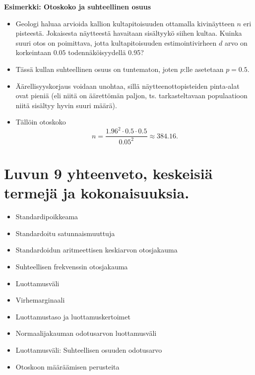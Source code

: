 \documentclass[
]{book}
\providecommand{\tightlist}{%
  \setlength{\itemsep}{0pt}\setlength{\parskip}{0pt}}
\begin{document}
\begin{eblock}{}

\textbf{Esimerkki: Otoskoko ja suhteellinen osuus}

\begin{itemize}
\item
  Geologi haluaa arvioida kallion kultapitoisuuden ottamalla kivinäytteen \(n\) eri pisteestä. Jokaisesta näytteestä havaitaan sisältyykö siihen kultaa. Kuinka suuri otos on poimittava, jotta kultapitoisuuden estimointivirheen \(d\) arvo on korkeintaan \(0.05\) todennäköisyydellä 0.95?
\item
  Tässä kullan suhteellinen osuus on tuntematon, joten \(p\):lle asetetaan \(p=0.5\).
\item
  Äärellisyyskorjaus voidaan unohtaa, sillä näytteenottopisteiden pinta-alat ovat pieniä (eli niitä on äärettömän paljon, ts. tarkasteltavaan populaatioon niitä sisältyy
  hyvin suuri määrä).
\item
  Tällöin otoskoko
  \[
  n = \frac{1.96^2 \cdot 0.5 \cdot 0.5}{0.05^2} \approx 384.16.
  \]
\end{itemize}

\end{eblock}

\hypertarget{luvun-9-yhteenveto-keskeisiuxe4-termejuxe4-ja-kokonaisuuksia.}{%
\section{Luvun 9 yhteenveto, keskeisiä termejä ja kokonaisuuksia.}\label{luvun-9-yhteenveto-keskeisiuxe4-termejuxe4-ja-kokonaisuuksia.}}

\begin{itemize}
\tightlist
\item
  Standardipoikkeama
\item
  Standardoitu satunnaismuuttuja
\item
  Standardoidun aritmeettisen keskiarvon otosjakauma
\item
  Suhteellisen frekvenssin otosjakauma
\item
  Luottamusväli
\item
  Virhemarginaali
\item
  Luottamustaso ja luottamuskertoimet
\item
  Normaalijakauman odotusarvon luottamusväli
\item
  Luottamusväli: Suhteellisen osuuden odotusarvo
\item
  Otoskoon määräämisen perusteita
\end{itemize}
\end{document}
